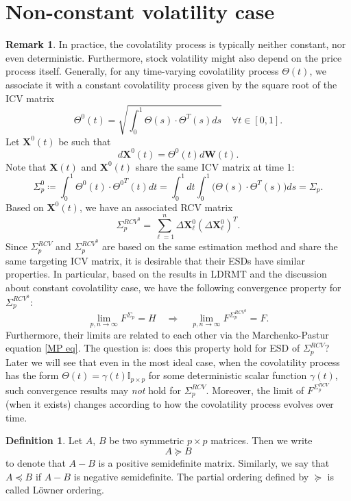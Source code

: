 \documentclass[a4paper,11pt]{book}
\theoremstyle{plain}
\theoremstyle{definition}
\newtheorem{defn}[thm]{Definition}
\newtheorem{rmrk}[thm]{Remark}
\begin{document}
	\section{Non-constant volatility case}
	\begin{rmrk}
		In practice, the covolatility process is typically neither constant, nor even deterministic. Furthermore, stock volatility might also depend on the price process itself. Generally, for any time-varying covolatility process $\Theta(t)$, we associate it with a constant covolatility process given by the square root of the ICV matrix
		\[ \Theta^0(t) = \sqrt{\int_0^1\Theta(s) \cdot \Theta^T(s) ds} \quad \forall t \in [0, 1]. \]
		Let $\mathbf{X}^0(t)$ be such that
		\[ d\mathbf{X}^0(t) = \Theta^0(t) d\mathbf{W}(t). \]
		Note that $\mathbf{X}(t)$ and $\mathbf{X}^0(t)$ share the same ICV matrix at time 1:
		\[ \Sigma_p^0 \coloneqq  \int_0^1 \Theta^0(t) \cdot {\Theta^0}^T(t) dt = \int_0^1 dt \int_0^1\Big( \Theta(s) \cdot {\Theta}^T(s)\Big) ds = \Sigma_p.  \]
		Based on $\mathbf{X}^0(t)$, we have an associated RCV matrix
		\[ \Sigma_p^{RCV^0} = \sum_{\ell=1}^{n} \Delta \mathbf{X}_\ell^0 (\Delta \mathbf{X}_\ell^0)^T. \]
		Since $\Sigma_p^{RCV}$ and $\Sigma_p^{RCV^0}$ are based on the same estimation method and share the same targeting ICV matrix, it is desirable that their ESDs have similar properties. In particular, based on the results in LDRMT and the discussion about constant covolatility case, we have the following convergence property for $\Sigma_p^{RCV^0}$: 
		\[ \lim_{p,n \rightarrow \infty} F^{\Sigma_p} = H \quad \Longrightarrow\quad \lim_{p,n \rightarrow \infty} F^{\Sigma_p^{RCV^0}} = F. \]
		Furthermore, their limits are related to each other via the Marchenko-Pastur equation \eqref{MP eq}. The question is: does this property hold for ESD of $\Sigma_p^{RCV}$? Later we will see that even in the most ideal case, when the covolatility process has the form $\Theta(t) =\gamma(t) \mathbb{I}_{p \times p}$ for some deterministic scalar function $\gamma(t)$, such convergence results may \textit{not} hold for $\Sigma_p^{RCV}$. Moreover, the limit of $F^{\Sigma_p^{RCV}}$ (when it exists) changes according to how the covolatility process evolves over time.
	\end{rmrk}
	
	\begin{defn}
		Let $A$, $B$ be two symmetric $p \times p$ matrices. Then we write
		\[ A \succeq B\]
		to denote that $A-B$ is a positive semidefinite matrix. Similarly, we say that $A \preceq B$ if $A-B$ is negative semidefinite. The partial ordering defined by $\succeq$ is called L\"owner ordering.
	\end{defn}
	
\end{document}
